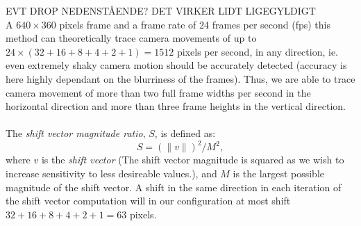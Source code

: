 %
EVT DROP NEDENSTÅENDE? DET VIRKER LIDT LIGEGYLDIGT\\
A $640\times360$ pixels frame and a frame rate of 24 frames per second (fps) this method can theoretically trace camera movements of up to $24 \times (32+16+8+4+2+1) = 1512$ pixels per second, in any direction, ie. even extremely shaky camera motion should be accurately detected (accuracy is here highly dependant on the blurriness of the frames). Thus, we are able to trace camera movement of more than two full frame widths per second in the horizontal direction and more than three frame heights in the vertical direction.\\\\
%
The \textit{shift vector magnitude ratio}, $S$, is defined as: %
\[
S = (\|v\|)^2 / M^2, 
\]
where $v$ is the \textit{shift vector} (The shift vector magnitude is squared as we wish to increase sensitivity to less desireable values.), and $M$ is the largest possible magnitude of the shift vector. A shift in the same direction in each iteration of the shift vector computation will in our configuration at most shift $32+16+8+4+2+1=63$ pixels.\\
%
